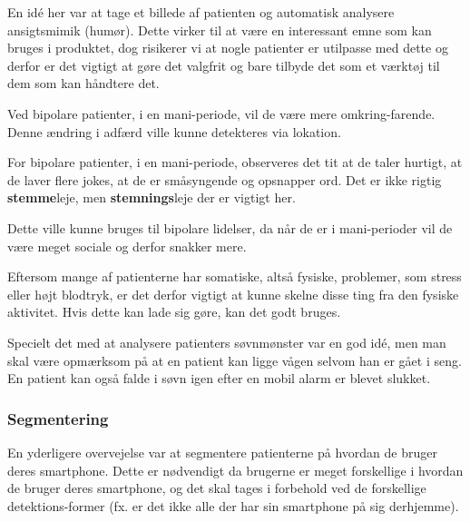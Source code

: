 \begin{description}[style=nextline]
\item[Billedanalyse]
En idé her var at tage et billede af patienten og automatisk analysere ansigtsmimik (humør).
Dette virker til at være en interessant emne som kan bruges i produktet, dog risikerer vi at nogle patienter er utilpasse med dette og derfor er det vigtigt at gøre det valgfrit og bare tilbyde det som et værktøj til dem som kan håndtere det.


\item[Lokation]
Ved bipolare patienter, i en mani-periode, vil de være mere omkring-farende.
Denne ændring i adfærd ville kunne detekteres via lokation.

\item[Lyd] 
For bipolare patienter, i en mani-periode, observeres det tit at de taler hurtigt, at de laver flere jokes, at de er småsyngende og opsnapper ord. Det er ikke rigtig \textbf{stemme}leje, men \textbf{stemnings}leje der er vigtigt her.

\item[Opkald]
Dette ville kunne bruges til bipolare lidelser, da når de er i mani-perioder vil de være meget sociale og derfor snakker mere. 

\item[Puls]
Eftersom mange af patienterne har somatiske, altså fysiske, problemer, som stress eller højt blodtryk, er det derfor vigtigt at kunne skelne disse ting fra den fysiske aktivitet.
Hvis dette kan lade sig gøre, kan det godt bruges.

\item[Søvn]
Specielt det med at analysere patienters søvnmønster var en god idé, men man skal være opmærksom på at en patient kan ligge vågen selvom han er gået i seng. 
En patient kan også falde i søvn igen efter en mobil alarm er blevet slukket.
\end{description}

\subsubsection{Segmentering}
En yderligere overvejelse var at segmentere patienterne på hvordan de bruger deres smartphone.
Dette er nødvendigt da brugerne er meget forskellige i hvordan de bruger deres smartphone, og det skal tages i forbehold ved de forskellige detektions-former (fx. er det ikke alle der har sin smartphone på sig derhjemme).

